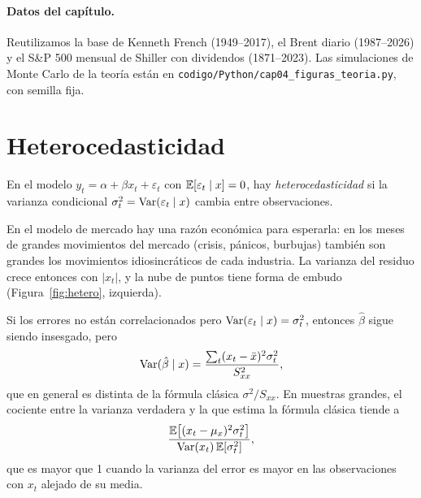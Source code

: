\paragraph{Datos del capítulo.} Reutilizamos la base de Kenneth French (1949--2017), el Brent diario
(1987--2026) y el S\&P 500 mensual de Shiller con dividendos (1871--2023). Las simulaciones de Monte Carlo
de la teoría están en \texttt{codigo/Python/cap04\_figuras\_teoria.py}, con semilla fija.

\section{Heterocedasticidad}

\begin{definicion}[Heterocedasticidad]
En el modelo $y_t=\alpha+\beta x_t+\varepsilon_t$ con $\mathbb{E}[\varepsilon_t\mid x]=0$, hay
\emph{heterocedasticidad} si la varianza condicional $\sigma^2_t=\operatorname{Var}(\varepsilon_t\mid x)$ cambia entre
observaciones.
\end{definicion}

En el modelo de mercado hay una razón económica para esperarla: en los meses de grandes movimientos del
mercado (crisis, pánicos, burbujas) también son grandes los movimientos idiosincráticos de cada industria.
La varianza del residuo crece entonces con $|x_t|$, y la nube de puntos tiene forma de embudo
(Figura~\ref{fig:hetero}, izquierda).

\begin{proposicion}\label{prop:mcohetero}
Si los errores no están correlacionados pero $\operatorname{Var}(\varepsilon_t\mid x)=\sigma_t^2$, entonces $\hat\beta$
sigue siendo insesgado, pero
\[
  \operatorname{Var}(\hat\beta\mid x)=\frac{\sum_t(x_t-\bar x)^2\sigma_t^2}{S_{xx}^2},
\]
que en general es distinta de la fórmula clásica $\sigma^2/S_{xx}$. En muestras grandes, el cociente entre
la varianza verdadera y la que estima la fórmula clásica tiende a
\[
  \frac{\mathbb{E}\bigl[(x_t-\mu_x)^2\sigma_t^2\bigr]}{\operatorname{Var}(x_t)\,\mathbb{E}[\sigma_t^2]},
\]
que es mayor que 1 cuando la varianza del error es mayor en las observaciones con $x_t$ alejado de su media.
\end{proposicion}

